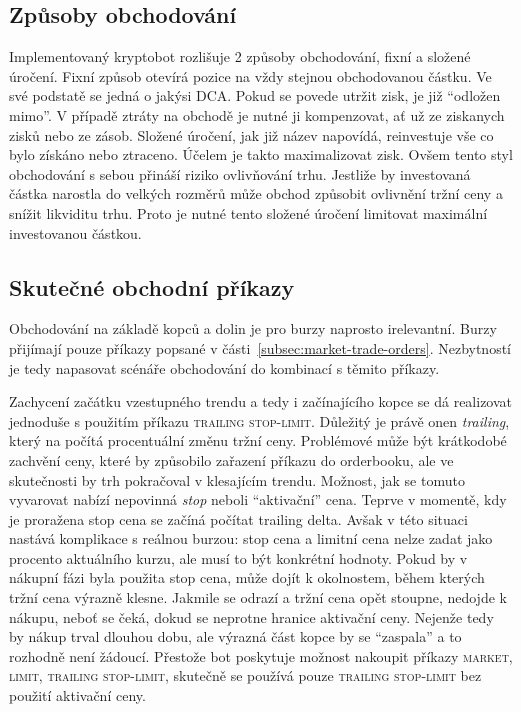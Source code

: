 \subsection{Způsoby obchodování}
Implementovaný kryptobot rozlišuje 2 způsoby obchodování, fixní a složené úročení. Fixní způsob otevírá pozice na vždy stejnou obchodovanou částku. Ve své podstatě se jedná o jakýsi DCA. Pokud se
povede utržit zisk, je již \enquote{odložen mimo}. V případě ztráty na obchodě je nutné ji kompenzovat, ať už ze ziskanych zisků nebo ze zásob.
Složené úročení, jak již název napovídá, reinvestuje vše co bylo získáno nebo ztraceno. Účelem je takto maximalizovat zisk. Ovšem tento styl obchodování s sebou přináší riziko ovlivňování trhu. Jestliže
by investovaná částka narostla do velkých rozměrů může obchod způsobit ovlivnění tržní ceny a snížit likviditu trhu. Proto je nutné tento složené úročení limitovat maximální investovanou částkou.


\subsection{Skutečné obchodní příkazy}
Obchodování na základě kopců a dolin je pro burzy naprosto irelevantní. Burzy přijímají pouze příkazy popsané v části~\ref{subsec:market-trade-orders}. Nezbytností je tedy napasovat scénáře
obchodování do kombinací s těmito příkazy.

Zachycení začátku vzestupného trendu a tedy i začínajícího kopce se dá realizovat jednoduše s použitím příkazu \textsc{trailing stop-limit}. Důležitý
je právě onen \emph{trailing}, který na počítá procentuální změnu tržní ceny. Problémové může být krátkodobé zachvění ceny, které by způsobilo zařazení příkazu do orderbooku, ale ve skutečnosti
by trh pokračoval v klesajícím trendu. Možnost, jak se tomuto vyvarovat nabízí nepovinná \emph{stop} neboli \enquote{aktivační} cena. Teprve v momentě, kdy je proražena stop cena se začíná počítat trailing
delta. Avšak v této situaci nastává komplikace s reálnou burzou: stop cena a limitní cena nelze zadat jako procento aktuálního kurzu, ale musí to být konkrétní hodnoty. Pokud by v nákupní fázi
byla použita stop cena, může dojít k okolnostem, během kterých tržní cena výrazně klesne. Jakmile se odrazí a tržní cena opět stoupne, nedojde k nákupu, neboť se čeká, dokud se neprotne hranice
aktivační ceny. Nejenže tedy by nákup trval dlouhou dobu, ale výrazná část kopce by se \enquote{zaspala} a to rozhodně není žádoucí. Přestože bot poskytuje možnost nakoupit příkazy \textsc{market,
    limit, trailing stop-limit}, skutečně se používá pouze \textsc{trailing stop-limit} bez použití aktivační ceny.

